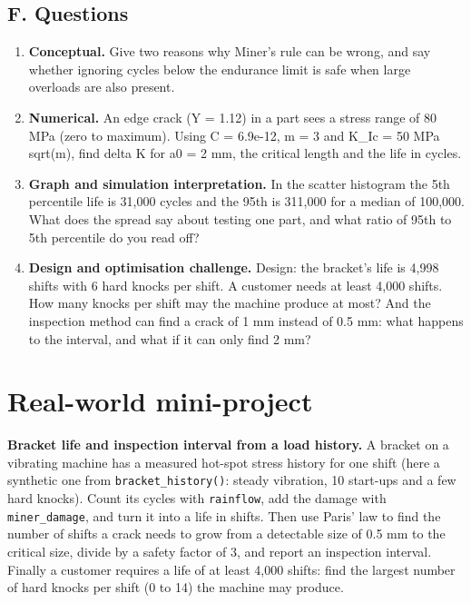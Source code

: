 \documentclass[11pt,a4paper]{article}
\begin{document}
\subsection*{F. Questions}
\begin{enumerate}[nosep]
\item \textbf{Conceptual.} Give two reasons why Miner's rule can be wrong, and say whether ignoring cycles below the endurance limit is safe when large overloads are also present.
\item \textbf{Numerical.} An edge crack (Y = 1.12) in a part sees a stress range of 80 MPa (zero to maximum). Using C = 6.9e-12, m = 3 and K\_Ic = 50 MPa sqrt(m), find delta K for a0 = 2 mm, the critical length and the life in cycles.
\item \textbf{Graph and simulation interpretation.} In the scatter histogram the 5th percentile life is 31,000 cycles and the 95th is 311,000 for a median of 100,000. What does the spread say about testing one part, and what ratio of 95th to 5th percentile do you read off?
\item \textbf{Design and optimisation challenge.} Design: the bracket's life is 4,998 shifts with 6 hard knocks per shift. A customer needs at least 4,000 shifts. How many knocks per shift may the machine produce at most? And the inspection method can find a crack of 1 mm instead of 0.5 mm: what happens to the interval, and what if it can only find 2 mm?
\end{enumerate}

\section{Real-world mini-project}
\textbf{Bracket life and inspection interval from a load history.} A bracket on a vibrating machine has a measured hot-spot stress history for one shift (here a synthetic one from \texttt{bracket\_history()}: steady vibration, 10 start-ups and a few hard knocks). Count its cycles with \texttt{rainflow}, add the damage with \texttt{miner\_damage}, and turn it into a life in shifts. Then use Paris' law to find the number of shifts a crack needs to grow from a detectable size of 0.5 mm to the critical size, divide by a safety factor of 3, and report an inspection interval. Finally a customer requires a life of at least 4,000 shifts: find the largest number of hard knocks per shift (0 to 14) the machine may produce.
\end{document}
